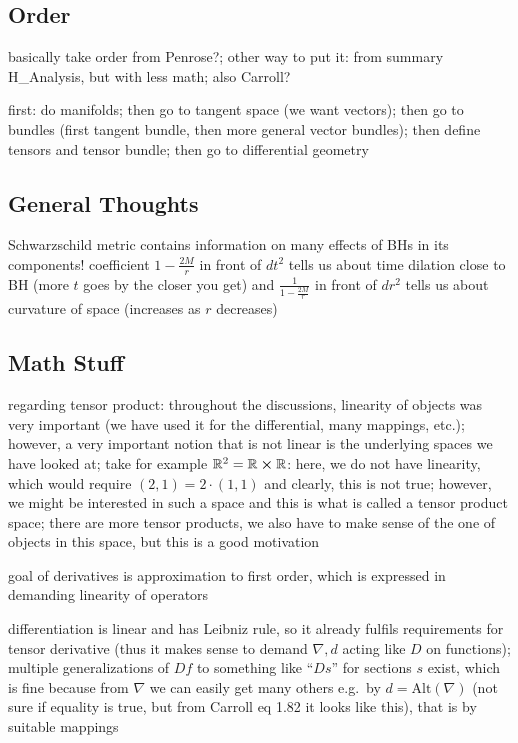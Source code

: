 \documentclass[ART_main.tex]{subfiles}
\begin{document}
		\subsection{Order}
basically take order from Penrose?; other way to put it: from summary H\_Analysis, but with less math; also Carroll?



first: do manifolds; then go to tangent space (we want vectors); then go to bundles (first tangent bundle, then more general vector bundles); then define tensors and tensor bundle; then go to differential geometry



	\subsection{General Thoughts}
Schwarzschild metric contains information on many effects of BHs in its components! coefficient $1 - \frac{2 M}{r}$ in front of $dt^2$ tells us about time dilation close to BH (more $t$ goes by the closer you get) and $\frac{1}{1 - \frac{2 M}{r}}$ in front of $dr^2$ tells us about curvature of space (increases as $r$ decreases)



		\subsection{Math Stuff}
regarding tensor product: throughout the discussions, linearity of objects was very important (we have used it for the differential, many mappings, etc.); however, a very important notion that is not linear is the underlying spaces we have looked at; take for example $\mathbb{R}^2 = \mathbb{R} \cross \mathbb{R}$: here, we do not have linearity, which would require $(2, 1) = 2 \cdot (1, 1)$ and clearly, this is not true; however, we might be interested in such a space and this is what is called a tensor product space; there are more tensor products, we also have to make sense of the one of objects in this space, but this is a good motivation


goal of derivatives is approximation to first order, which is expressed in demanding linearity of operators


differentiation is linear and has Leibniz rule, so it already fulfils requirements for tensor derivative (thus it makes sense to demand $\nabla, d$ acting like $D$ on functions); multiple generalizations of $Df$ to something like \enquote{$Ds$} for sections $s$ exist, which is fine because from $\nabla$ we can easily get many others e.g.~by $d = \text{Alt}(\nabla)$ (not sure if equality is true, but from Carroll eq 1.82 it looks like this), that is by suitable mappings
\end{document}
